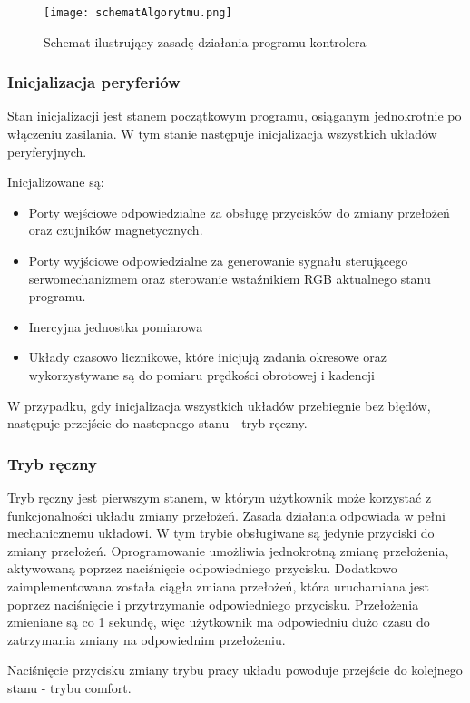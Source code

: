 \begin{figure}[h]
    \centering
    \texttt{[image: schematAlgorytmu.png]}
    \caption{Schemat ilustrujący zasadę działania programu kontrolera}
    \label{fig:schematAlgorytmu}
\end{figure}
\subsubsection{Inicjalizacja peryferiów}
Stan inicjalizacji jest stanem początkowym programu, osiąganym jednokrotnie po włączeniu zasilania. W tym stanie następuje inicjalizacja wszystkich układów peryferyjnych. 

Inicjalizowane są:
\begin{itemize}
\item
Porty wejściowe odpowiedzialne za obsługę przycisków do zmiany przełożeń oraz czujników magnetycznych.
\item
Porty wyjściowe odpowiedzialne za generowanie sygnału sterującego serwomechanizmem oraz sterowanie wstaźnikiem RGB aktualnego stanu programu. 
\item
Inercyjna jednostka pomiarowa
\item
Układy czasowo licznikowe, które inicjują zadania okresowe oraz wykorzystywane są do pomiaru prędkości obrotowej i kadencji
\end{itemize}

W przypadku, gdy inicjalizacja wszystkich układów przebiegnie bez błędów, następuje przejście do nastepnego stanu - tryb ręczny.
\subsubsection{Tryb ręczny}
Tryb ręczny jest pierwszym stanem, w którym użytkownik może korzystać z funkcjonalności układu zmiany przełożeń. Zasada działania odpowiada w pełni mechanicznemu układowi. W tym trybie obsługiwane są jedynie przyciski do zmiany przełożeń. Oprogramowanie umożliwia jednokrotną zmianę przełożenia, aktywowaną poprzez naciśnięcie odpowiedniego przycisku. Dodatkowo zaimplementowana została ciągła zmiana przełożeń, która uruchamiana jest poprzez naciśnięcie i przytrzymanie odpowiedniego przycisku. Przełożenia zmieniane są co 1 sekundę, więc użytkownik ma odpowiedniu dużo czasu do zatrzymania zmiany na odpowiednim przełożeniu.

Naciśnięcie przycisku zmiany trybu pracy układu powoduje przejście do kolejnego stanu - trybu comfort.

